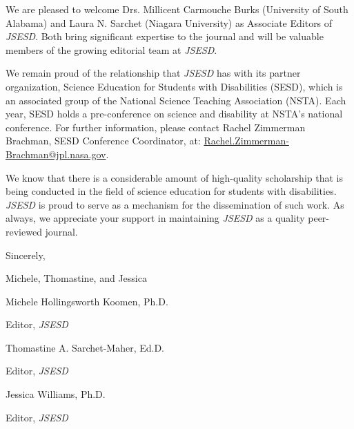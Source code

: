 \documentclass{sig-alternate} %
\begin{document}
\begin{large}
We are pleased to welcome Drs. Millicent Carmouche Burks (University of South Alabama) and Laura N. Sarchet (Niagara University) as Associate Editors of \textit{JSESD}. Both bring significant expertise to the journal and will be valuable members of the growing editorial team at \textit{JSESD}.

We remain proud of the relationship that \textit{JSESD} has with its partner organization, Science Education for Students with Disabilities (SESD), which is an associated group of the National Science Teaching Association (NSTA). Each year, SESD holds a pre-conference on science and disability at NSTA’s national conference. For further information, please contact Rachel Zimmerman Brachman, SESD Conference Coordinator, at: \href{mailto:Rachel.Zimmerman-Brachman@jpl.nasa.gov}{Rachel.Zimmerman-Brachman@jpl.nasa.gov}.

We know that there is a considerable amount of high-quality scholarship that is being conducted in the field of science education for students with disabilities. \textit{JSESD} is proud to serve as a mechanism for the dissemination of such work. As always, we appreciate your support in maintaining \textit{JSESD} as a quality peer-reviewed journal.

Sincerely,

Michele, Thomastine, and Jessica

Michele Hollingsworth Koomen, Ph.D.

Editor, \textit{JSESD}

Thomastine A. Sarchet-Maher, Ed.D.

Editor, \textit{JSESD}

Jessica Williams, Ph.D.

Editor, \textit{JSESD}

\end{large}
\end{document}
